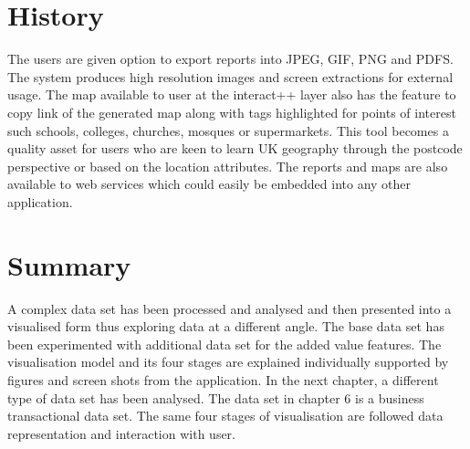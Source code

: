 \section{History}

The users are given option to export reports into JPEG, GIF, PNG and PDFS. The system produces high resolution images and screen extractions for external usage. The map available to user at the interact++ layer also has the feature to copy link of the generated map along with tags highlighted for points of interest such schools, colleges, churches, mosques or supermarkets. This tool becomes a quality asset for users who are keen to learn UK geography through the postcode perspective or based on the location attributes. The reports and maps are also available to web services which could easily be embedded into any other application. 

\section{Summary}

A complex data set has been processed and analysed and then presented into a visualised form thus exploring data at a different angle. The base data set has been experimented with additional data set for the added value features. The visualisation model and its four stages are explained individually supported by figures and screen shots from the application. In the next chapter, a different type of data set has been analysed. The data set in chapter 6 is a business transactional data set. The same four stages of visualisation are followed data representation and interaction with user. 




